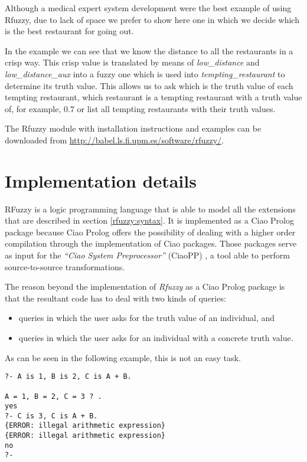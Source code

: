 \documentclass[runningheads,a4paper]{llncs}
\begin{document}
Although a medical expert system development were the best example of  
using Rfuzzy, due to lack of space we prefer to show here one     
in which we decide which is the best restaurant for going out.       




In the example we can see that we know the distance to all the 
restaurants in a crisp way. This crisp value is translated by means of
{\it low\_distance} and {\it low\_distance\_aux} into a fuzzy one 
which is used into {\it tempting\_restaurant} to determine its 
truth value. This allows us to ask which is the truth value of each 
tempting restaurant, which restaurant is a tempting 
restaurant with a truth value of, for example, 0.7 or list all 
tempting restaurants with their truth values.

The Rfuzzy module with installation instructions and examples can be
downloaded from \url{http://babel.ls.fi.upm.es/software/rfuzzy/}.



\section{Implementation details}

RFuzzy is a logic programming language that is able to model 
all the extensions that are described in section
\ref{rfuzzy:syntax}. 
It is implemented as a Ciao Prolog \cite{ciao-prolog:site} 
package because Ciao Prolog offers the possibility of dealing 
with a higher order compilation through the implementation 
of Ciao packages.
Those packages serve as input for the 
{\it``Ciao System Preprocessor''} (CiaoPP) \cite{ciaopp-manual}, 
a tool able to perform source-to-source transformations.

The reason beyond the implementation of {\it Rfuzzy } as a Ciao 
Prolog package is that 
the resultant code has to deal with two kinds of queries:
\begin{itemize}
\item queries in which the user asks for the truth value of an individual, and
\item queries in which the user asks for an individual with a concrete truth value.
\end{itemize}

As can be seen in the following example, 
this is not an easy task.
\begin{verbatim}
?- A is 1, B is 2, C is A + B.

A = 1, B = 2, C = 3 ? .
yes
?- C is 3, C is A + B.
{ERROR: illegal arithmetic expression}
{ERROR: illegal arithmetic expression}
no
?- 
\end{verbatim}
\end{document}

